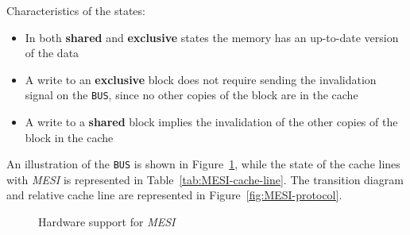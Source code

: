 \documentclass[english]{article}
\begin{document}
Characteristics of the states:

\begin{itemize}
  \item In both \textbf{shared} and \textbf{exclusive} states the memory has an up-to-date version of the data
  \item A write to an \textbf{exclusive} block does not require sending the invalidation signal on the \texttt{BUS}, since no other copies of the block are in the cache
  \item A write to a \textbf{shared} block implies the invalidation of the other copies of the block in the cache
\end{itemize}

\bigskip
An illustration of the \texttt{BUS} is shown in Figure~\ref{subfig:MESI-bus-rd}, while the state of the cache lines with \textit{MESI} is represented in Table~\ref{tab:MESI-cache-line}.
The transition diagram and relative cache line are represented in Figure~\ref{fig:MESI-protocol}.

\begin{figure}[htbp]
  \centering
  \bigskip
  \caption{Hardware support for \textit{MESI}}
  \label{subfig:MESI-bus-rd}
  \bigskip
\end{figure}
\end{document}
